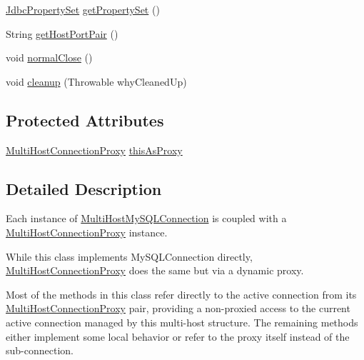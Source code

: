 \begin{DoxyCompactItemize}
$$\item 
\mbox{\hyperlink{interfacecom_1_1mysql_1_1cj_1_1jdbc_1_1_jdbc_property_set}{Jdbc\+Property\+Set}} \mbox{\hyperlink{classcom_1_1mysql_1_1cj_1_1jdbc_1_1ha_1_1_multi_host_my_s_q_l_connection_adc1a5c59c115064dc892d458337dd638}{get\+Property\+Set}} ()
\item 
String \mbox{\hyperlink{classcom_1_1mysql_1_1cj_1_1jdbc_1_1ha_1_1_multi_host_my_s_q_l_connection_aab6d43bb954ed5a08608412697c35c23}{get\+Host\+Port\+Pair}} ()
\item 
void \mbox{\hyperlink{classcom_1_1mysql_1_1cj_1_1jdbc_1_1ha_1_1_multi_host_my_s_q_l_connection_a926772cecea56ad4444ebd84d576bdc4}{normal\+Close}} ()
\item 
void \mbox{\hyperlink{classcom_1_1mysql_1_1cj_1_1jdbc_1_1ha_1_1_multi_host_my_s_q_l_connection_a60353fa7a398c8186c22a0ceba331655}{cleanup}} (Throwable why\+Cleaned\+Up)
\end{DoxyCompactItemize}
\subsection*{Protected Attributes}
\begin{DoxyCompactItemize}
\item 
\mbox{\hyperlink{classcom_1_1mysql_1_1cj_1_1jdbc_1_1ha_1_1_multi_host_connection_proxy}{Multi\+Host\+Connection\+Proxy}} \mbox{\hyperlink{classcom_1_1mysql_1_1cj_1_1jdbc_1_1ha_1_1_multi_host_my_s_q_l_connection_aa24e7362ca07c5968a5ecc7db8bbc841}{this\+As\+Proxy}}
\end{DoxyCompactItemize}


\subsection{Detailed Description}
Each instance of \mbox{\hyperlink{classcom_1_1mysql_1_1cj_1_1jdbc_1_1ha_1_1_multi_host_my_s_q_l_connection}{Multi\+Host\+My\+S\+Q\+L\+Connection}} is coupled with a \mbox{\hyperlink{classcom_1_1mysql_1_1cj_1_1jdbc_1_1ha_1_1_multi_host_connection_proxy}{Multi\+Host\+Connection\+Proxy}} instance.

While this class implements My\+S\+Q\+L\+Connection directly, \mbox{\hyperlink{classcom_1_1mysql_1_1cj_1_1jdbc_1_1ha_1_1_multi_host_connection_proxy}{Multi\+Host\+Connection\+Proxy}} does the same but via a dynamic proxy.

Most of the methods in this class refer directly to the active connection from its \mbox{\hyperlink{classcom_1_1mysql_1_1cj_1_1jdbc_1_1ha_1_1_multi_host_connection_proxy}{Multi\+Host\+Connection\+Proxy}} pair, providing a non-\/proxied access to the current active connection managed by this multi-\/host structure. The remaining methods either implement some local behavior or refer to the proxy itself instead of the sub-\/connection.

